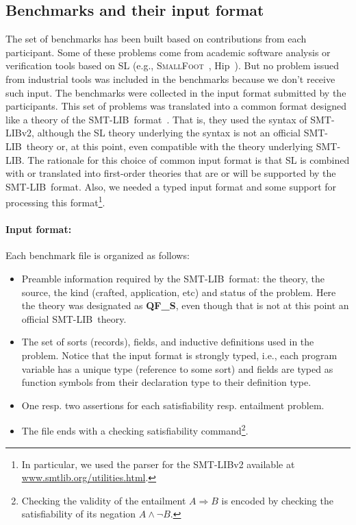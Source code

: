 \documentclass[twoside,11pt]{article}
\newcommand{\limp}{\Rightarrow}
\newcommand{\smtlib}{\textsf{SMT-LIB}}
\begin{document}
\subsection{Benchmarks and their input format}

The set of benchmarks has been built based on contributions from each participant. 
Some of these problems come from academic software analysis or verification tools based on SL 
(e.g., \textsc{SmallFoot}~\cite{SmallFootsite}, \textsf{Hip}~\cite{ChinDNQ12}).
But no problem issued from industrial tools was included in the benchmarks because we don't receive such input.
The benchmarks were collected in the input format submitted by the participants. 
This set of problems was translated into a common format designed like a theory of the \smtlib\ format~\cite{BarST-SMTLIB}.
That is, they used the syntax of \smtlib v2, although the SL theory underlying the syntax is not an official \smtlib\ theory or, at this point, even compatible with the theory underlying \smtlib.
The rationale for this choice of common input format is 
that SL is combined with or translated into first-order theories that are or will be supported by the \smtlib\ format.
Also, we needed a typed input format and some support for processing this format\footnote{In particular, we used the parser for the \smtlib v2 available at \url{www.smtlib.org/utilities.html}.}.
 
\paragraph{Input format:} Each benchmark file is organized as follows:
\begin{itemize}
\item Preamble information required by the \smtlib\ format: the theory, the source, the kind (crafted, application, etc) and status of the problem.  Here the theory was designated as \textbf{QF\_S}, even though that is not at this point an official \smtlib\ theory. 
\item The set of sorts (records), fields, and inductive definitions used in the problem. Notice that the input format is strongly typed, i.e., each program variable has a unique type (reference to some sort) and 
fields are typed as function symbols from their declaration type to their definition type. 
\item One resp. two assertions for each satisfiability resp. entailment problem. 
\item The file ends with a checking satisfiability command\footnote{Checking the validity of the entailment $A\limp B$ is encoded by checking the satisfiability of its negation $A \land \lnot B$.}.
\end{itemize}
\end{document}
